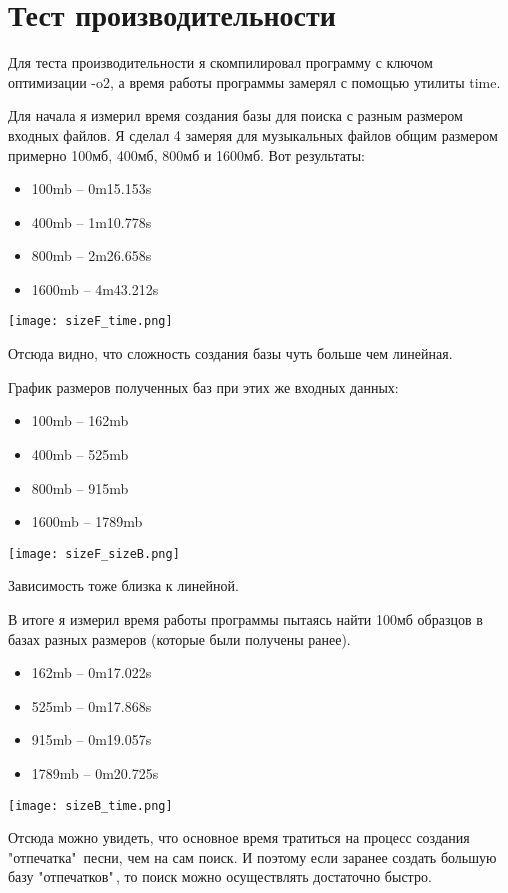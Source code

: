 \section{Тест производительности}
\par Для теста производительности я скомпилировал программу с ключом оптимизации -o2, а время работы программы замерял с помощью утилиты time.

Для начала я измерил время создания базы для поиска с разным размером входных файлов. Я сделал 4 замеряя для музыкальных файлов общим размером примерно 100мб, 400мб, 800мб и 1600мб. Вот результаты:

\begin{itemize}
	\item 100mb -- 0m15.153s
	\item 400mb -- 1m10.778s
	\item 800mb -- 2m26.658s
	\item 1600mb -- 4m43.212s
\end{itemize}

\texttt{[image: sizeF\_time.png]}

Отсюда видно, что сложность создания базы чуть больше чем линейная.

График размеров полученных баз при этих же входных данных:
\begin{itemize}
	\item 100mb -- 162mb
	\item 400mb -- 525mb
	\item 800mb -- 915mb
	\item 1600mb -- 1789mb
\end{itemize}

\texttt{[image: sizeF\_sizeB.png]}

Зависимость тоже близка к линейной.

В итоге я измерил время работы программы пытаясь найти 100мб образцов в базах разных размеров (которые были получены ранее).

\begin{itemize}
	\item 162mb -- 0m17.022s
	\item 525mb -- 0m17.868s
	\item 915mb -- 0m19.057s
	\item 1789mb -- 0m20.725s
\end{itemize}

\texttt{[image: sizeB\_time.png]}

Отсюда можно увидеть, что основное время тратиться на процесс создания "отпечатка"\, песни, чем на сам поиск. И поэтому если заранее создать большую базу "отпечатков"\,, то поиск можно осуществлять достаточно быстро.
\pagebreak
